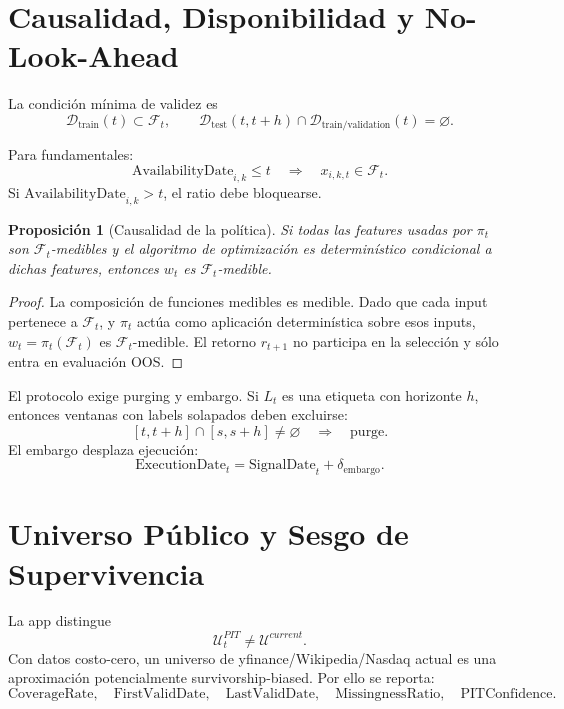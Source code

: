 \documentclass[11pt,letterpaper]{article}
\newtheorem{proposition}{Proposición}
\newcommand{\F}{\mathcal{F}}
\newcommand{\D}{\mathcal{D}}
\newcommand{\U}{\mathcal{U}}
\newcommand{\1}{\mathbbm{1}}
\begin{document}
\section{Causalidad, Disponibilidad y No-Look-Ahead}

La condición mínima de validez es
\[
  \D_{\mathrm{train}}(t)\subset\F_t,
  \qquad
  \D_{\mathrm{test}}(t,t+h)\cap
  \D_{\mathrm{train/validation}}(t)
  =
  \varnothing.
\]

Para fundamentales:
\[
  \mathrm{AvailabilityDate}_{i,k}\le t
  \quad\Rightarrow\quad
  x_{i,k,t}\in\F_t.
\]
Si \(\mathrm{AvailabilityDate}_{i,k}>t\), el ratio debe bloquearse.

\begin{proposition}[Causalidad de la política]
Si todas las features usadas por \(\pi_t\) son \(\F_t\)-medibles y el algoritmo de optimización es determinístico condicional a dichas features, entonces \(w_t\) es \(\F_t\)-medible.
\end{proposition}

\begin{proof}
La composición de funciones medibles es medible. Dado que cada input pertenece a \(\F_t\), y \(\pi_t\) actúa como aplicación determinística sobre esos inputs, \(w_t=\pi_t(\F_t)\) es \(\F_t\)-medible. El retorno \(r_{t+1}\) no participa en la selección y sólo entra en evaluación OOS.
\end{proof}

El protocolo exige purging y embargo. Si \(L_t\) es una etiqueta con horizonte \(h\), entonces ventanas con labels solapados deben excluirse:
\[
  [t,t+h]\cap[s,s+h]\ne\varnothing
  \quad\Rightarrow\quad
  \text{purge}.
\]
El embargo desplaza ejecución:
\[
  \mathrm{ExecutionDate}_t
  =
  \mathrm{SignalDate}_t+\delta_{\mathrm{embargo}}.
\]

\section{Universo Público y Sesgo de Supervivencia}

La app distingue
\[
  \U_t^{PIT}\ne \U^{current}.
\]
Con datos costo-cero, un universo de yfinance/Wikipedia/Nasdaq actual es una aproximación potencialmente survivorship-biased. Por ello se reporta:
\[
  \text{CoverageRate},\quad
  \text{FirstValidDate},\quad
  \text{LastValidDate},\quad
  \text{MissingnessRatio},\quad
  \text{PITConfidence}.
\]
\end{document}
